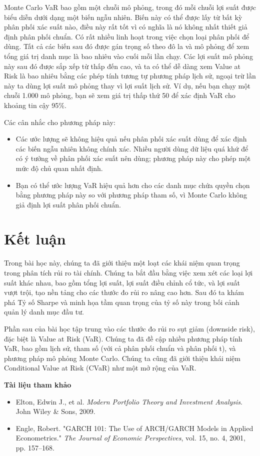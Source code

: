 Monte Carlo VaR bao gồm một chuỗi mô phỏng, trong đó mỗi chuỗi lợi suất được biểu diễn dưới dạng một biến ngẫu nhiên. Biến này có thể được lấy từ bất kỳ phân phối xác suất nào, điều này rất tốt vì có nghĩa là nó không nhất thiết giả định phân phối chuẩn. Có rất nhiều linh hoạt trong việc chọn loại phân phối để dùng. Tất cả các biến sau đó được gán trọng số theo đô la và mô phỏng để xem tổng giá trị danh mục là bao nhiêu vào cuối mỗi lần chạy. Các lợi suất mô phỏng này sau đó được sắp xếp từ thấp đến cao, và ta có thể dễ dàng xem Value at Risk là bao nhiêu bằng các phép tính tương tự phương pháp lịch sử, ngoại trừ lần này ta dùng lợi suất mô phỏng thay vì lợi suất lịch sử. Ví dụ, nếu bạn chạy một chuỗi 1.000 mô phỏng, bạn sẽ xem giá trị thấp thứ 50 để xác định VaR cho khoảng tin cậy 95\%.

Các cân nhắc cho phương pháp này:
\begin{itemize}
  \item Các ước lượng sẽ không hiệu quả nếu phân phối xác suất dùng để xác định các biến ngẫu nhiên không chính xác. Nhiều người dùng dữ liệu quá khứ để có ý tưởng về phân phối xác suất nên dùng; phương pháp này cho phép một mức độ chủ quan nhất định.
  \item Bạn có thể ước lượng VaR hiệu quả hơn cho các danh mục chứa quyền chọn bằng phương pháp này so với phương pháp tham số, vì Monte Carlo không giả định lợi suất phân phối chuẩn.
\end{itemize}

\section{Kết luận}

Trong bài học này, chúng ta đã giới thiệu một loạt các khái niệm quan trọng trong phân tích rủi ro tài chính. Chúng ta bắt đầu bằng việc xem xét các loại lợi suất khác nhau, bao gồm tổng lợi suất, lợi suất điều chỉnh cổ tức, và lợi suất vượt trội, tạo nền tảng cho các thước đo rủi ro nâng cao hơn. Sau đó ta khám phá Tỷ số Sharpe và minh họa tầm quan trọng của tỷ số này trong bối cảnh quản lý danh mục đầu tư.

Phần sau của bài học tập trung vào các thước đo rủi ro sụt giảm (downside risk), đặc biệt là Value at Risk (VaR). Chúng ta đã đề cập nhiều phương pháp tính VaR, bao gồm lịch sử, tham số (với cả phân phối chuẩn và phân phối t), và phương pháp mô phỏng Monte Carlo. Chúng ta cũng đã giới thiệu khái niệm Conditional Value at Risk (CVaR) như một mở rộng của VaR.

\textbf{Tài liệu tham khảo}

\begin{itemize}
  \item Elton, Edwin J., et al. \emph{Modern Portfolio Theory and Investment Analysis}. John Wiley \& Sons, 2009.
  \item Engle, Robert. "GARCH 101: The Use of ARCH/GARCH Models in Applied Econometrics." \emph{The Journal of Economic Perspectives}, vol. 15, no. 4, 2001, pp. 157--168.
\end{itemize}
